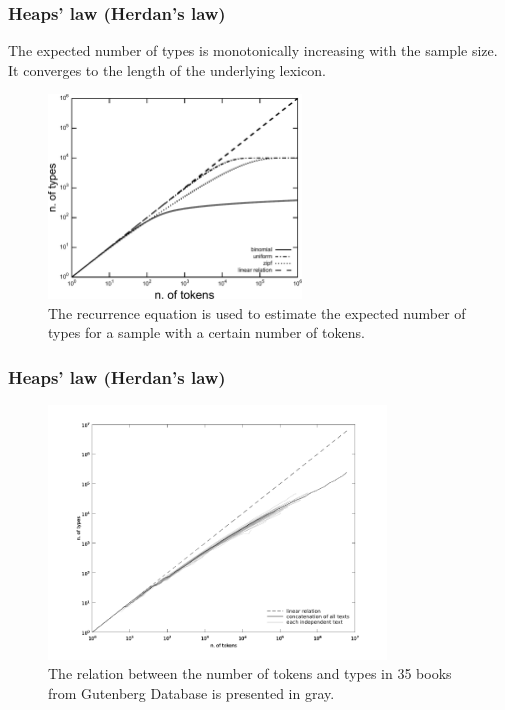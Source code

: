\documentclass{beamer}
\begin{document}
\frame
{
  \frametitle{Heaps' law (Herdan's law)}  
  The expected number of types is monotonically increasing with the sample size. 
  It converges to the length of the underlying lexicon.

  \begin{figure}[h]
  \centering
  \includegraphics[width=0.6\textwidth]{images/heapslaw_rdist.pdf}
  \caption{The recurrence equation is used to estimate the expected number of types for a sample with a certain number of tokens.}
  \label{fig:heapslaw_rdist}
  \end{figure} 
}


\frame
{
  \frametitle{Heaps' law (Herdan's law)}
  \vspace{-0.3cm}
  \begin{figure}[h]
  \centering
  \includegraphics[width=0.8\textwidth]{images/heapslawtexts.png}
  \caption{The relation between the number of tokens and types in 35 books from Gutenberg Database is presented in gray.} 
  \label{fig:heapslawtexts}
  \end{figure}
}
\end{document}
